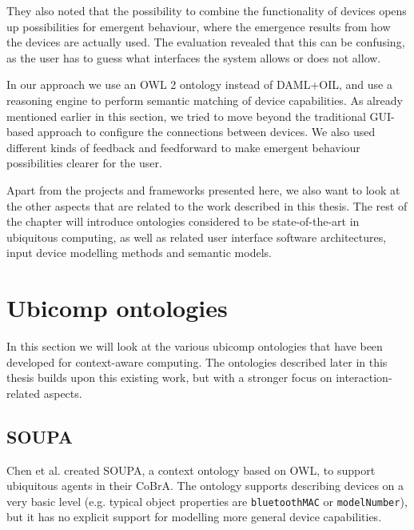 They also noted that the possibility to combine the functionality of devices opens up possibilities for emergent behaviour, where the emergence results from how the devices are actually used. The evaluation revealed that this can be confusing, as the user has to guess what interfaces the system allows or does not allow.

In our approach we use an \ac{OWL} 2 ontology instead of \ac{DAML}+\ac{OIL}, and use a reasoning engine to perform semantic matching of device capabilities. As already mentioned earlier in this section, we tried to move beyond the traditional \ac{GUI}-based approach to configure the connections between devices. We also used different kinds of feedback and feedforward to make emergent behaviour possibilities clearer for the user.

Apart from the projects and frameworks presented here, we also want to look at the other aspects that are related to the work described in this thesis. The rest of the chapter will introduce ontologies considered to be state-of-the-art in ubiquitous computing, as well as related user interface software architectures, input device modelling methods and semantic models.

\section{Ubicomp ontologies}
\label{UbicompOntologies}
In this section we will look at the various ubicomp ontologies that have been developed for context-aware computing. The ontologies described later in this thesis builds upon this existing work, but with a stronger focus on interaction-related aspects. 
 

\subsection{SOUPA}

Chen et al. \cite{Chen2004} created \ac{SOUPA}, a context ontology based on \ac{OWL}, to support ubiquitous agents in their \ac{CoBrA}. The ontology supports describing devices on a very basic level (e.g. typical object properties are \texttt{bluetoothMAC} or \texttt{modelNumber}), but it has no explicit support for modelling more general device capabilities.


